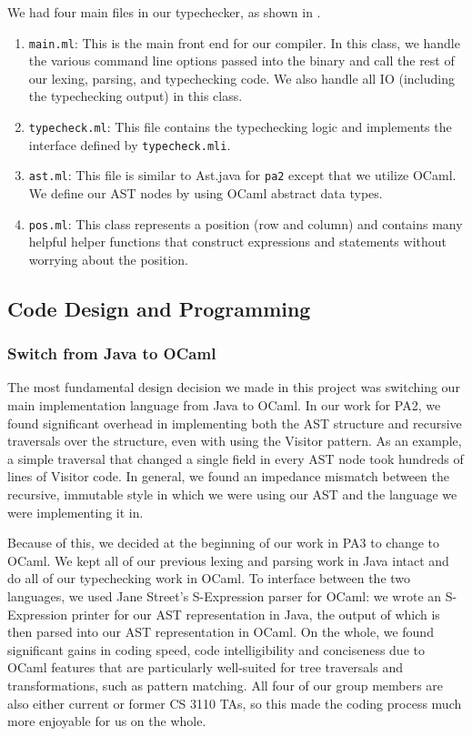 \documentclass{hw}
\begin{document}
We had four main files in our typechecker, as shown in .
\begin{enumerate}
  \item{\texttt{main.ml}:}
    This is the main front end for our compiler. In this class, we handle the
    various command line options passed into the binary and call the rest of
    our lexing, parsing, and typechecking code. We also handle all IO (including the typechecking
    output) in this class.

  \item{\texttt{typecheck.ml}:}
    This file contains the typechecking logic and implements the interface defined by \texttt{typecheck.mli}.

  \item{\texttt{ast.ml}:}
    This file is similar to Ast.java for \texttt{pa2} except that we utilize OCaml. We define our AST nodes by using OCaml abstract data types.

  \item{\texttt{pos.ml}:}
    This class represents a position (row and column) and contains many helpful helper functions that construct expressions and statements without worrying about the position.

\end{enumerate}

\subsection{Code Design and Programming}
\subsubsection{Switch from Java to OCaml}
The most fundamental design decision we made in this project was switching our
main implementation language from Java to OCaml. In our work for PA2,
we found significant overhead in implementing both the AST structure and recursive
traversals over the structure, even with using the Visitor pattern. As an example,
a simple traversal that changed a single field in every AST node took hundreds of lines
of Visitor code. In general, we found an impedance mismatch between the recursive,
immutable style in which we were using our AST and the language we were implementing
it in.

Because of this, we decided at the beginning of our work in PA3 to change to OCaml.
We kept all of our previous lexing and parsing work in Java intact and do all of our
typechecking work in OCaml. To interface between the two languages, we used Jane Street's
S-Expression parser for OCaml: we wrote an S-Expression printer for our AST representation
in Java, the output of which is then parsed into our AST representation in OCaml. On the
whole, we found significant gains in coding speed, code intelligibility and conciseness
due to OCaml features that are particularly well-suited for tree traversals and transformations, such as pattern matching. All four of our group members are also either current or former
CS 3110 TAs, so this made the coding process much more enjoyable for us on the whole.
\end{document}
